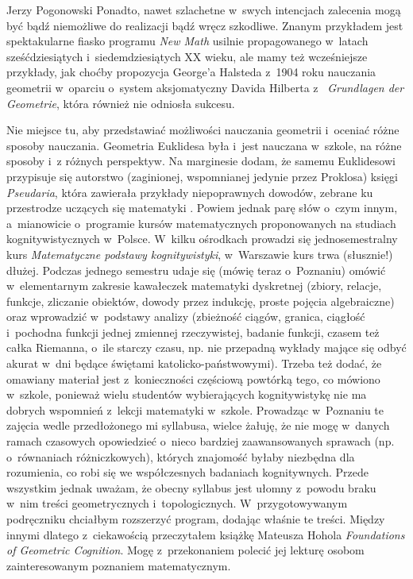 \begin{newrevplenv}{Jerzy Pogonowski}
Ponadto, nawet szlachetne w~swych intencjach zalecenia mogą być
bądź niemożliwe do realizacji bądź wręcz szkodliwe. Znanym
przykładem jest spektakularne fiasko programu {\em New Math}
usilnie propagowanego w~latach sześćdziesiątych i~siedemdziesiątych XX wieku, ale mamy też wcześniejsze przykłady,
jak choćby propozycja George'a Halsteda z~1904 roku nauczania
geometrii w~oparciu o~system aksjomatyczny Davida Hilberta z~{\em
Grundlagen der Geometrie}, która również nie odniosła sukcesu.

Nie miejsce tu, aby przedstawiać możliwości nauczania geometrii i~oceniać różne sposoby nauczania. Geometria Euklidesa była i~jest
nauczana w~szkole, na różne sposoby i~z różnych perspektyw. Na
marginesie dodam, że samemu Euklidesowi przypisuje się autorstwo
(zaginionej, wspomnianej jedynie przez Proklosa) księgi {\em
Pseudaria}, która zawierała przykłady niepoprawnych dowodów,
zebrane ku przestrodze uczących się matematyki \parencite{acerbi_euclids_2008}.
Powiem jednak parę słów o~czym innym, a~mianowicie o~programie
kursów matematycznych proponowanych na studiach kognitywistycznych
w~Polsce. W~kilku ośrodkach prowadzi się jednosemestralny kurs
{\em Matematyczne podstawy kognitywistyki}, w~Warszawie kurs trwa
(słusznie!) dłużej. Podczas jednego semestru udaje się (mówię
teraz o~Poznaniu) omówić w~elementarnym zakresie kawałeczek
matematyki dyskretnej (zbiory, relacje, funkcje, zliczanie
obiektów, dowody przez indukcję, proste pojęcia algebraiczne) oraz
wprowadzić w~podstawy analizy (zbieżność ciągów, granica, ciągłość
i~pochodna funkcji jednej zmiennej rzeczywistej, badanie funkcji,
czasem też całka Riemanna, o~ile starczy czasu, np. nie przepadną
wykłady mające się odbyć akurat w~dni będące świętami
katolicko-państwowymi). Trzeba też dodać, że omawiany materiał
jest z~konieczności częściową powtórką tego, co mówiono w~szkole,
ponieważ wielu studentów wybierających kognitywistykę nie ma
dobrych wspomnień z~lekcji matematyki w~szkole. Prowadząc w~Poznaniu te zajęcia wedle przedłożonego mi syllabusa, wielce
żałuję, że nie mogę w~danych ramach czasowych opowiedzieć o~nieco
bardziej zaawansowanych sprawach (np. o~równaniach różniczkowych),
których znajomość byłaby niezbędna dla rozumienia, co robi się we
współczesnych badaniach kognitywnych. Przede wszystkim jednak
uważam, że obecny syllabus jest ułomny z~powodu braku w~nim treści
geometrycznych i~topologicznych. W~przygotowywanym podręczniku
chciałbym rozszerzyć program, dodając właśnie te treści. Między
innymi dlatego z~ciekawością przeczytałem książkę Mateusza Hohola
{\em Foundations of Geometric Cognition}. Mogę z~przekonaniem
polecić jej lekturę osobom zainteresowanym poznaniem
matematycznym.





\end{newrevplenv}
